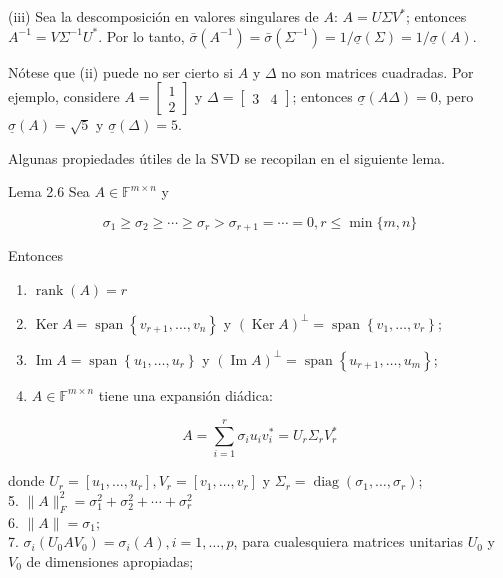 \documentclass[11pt]{article}
\begin{document}
(iii) Sea la descomposición en valores singulares de $A$: $A=U \Sigma V^{*}$; entonces $A^{-1}=V \Sigma^{-1} U^{*}$. Por lo tanto, $\bar{\sigma}\left(A^{-1}\right)=\bar{\sigma}\left(\Sigma^{-1}\right)=1 / \underline{\sigma}(\Sigma)=1 / \underline{\sigma}(A)$.

Nótese que (ii) puede no ser cierto si $A$ y $\Delta$ no son matrices cuadradas. Por ejemplo, considere $A=\left[\begin{array}{l}1 \\ 2\end{array}\right]$ y $\Delta=\left[\begin{array}{ll}3 & 4\end{array}\right]$; entonces $\underline{\sigma}(A \Delta)=0$, pero $\underline{\sigma}(A)=\sqrt{5}$ y $\underline{\sigma}(\Delta)=5$.

Algunas propiedades útiles de la SVD se recopilan en el siguiente lema.

Lema 2.6 Sea $A \in \mathbb{F}^{m \times n}$ y

$$
\sigma_{1} \geq \sigma_{2} \geq \cdots \geq \sigma_{r}>\sigma_{r+1}=\cdots=0, r \leq \min \{m, n\}
$$

Entonces

\begin{enumerate}
  \item $\operatorname{rank}(A)=r$
  \item $\operatorname{Ker} A=\operatorname{span}\left\{v_{r+1}, \ldots, v_{n}\right\}$ y $(\operatorname{Ker} A)^{\perp}=\operatorname{span}\left\{v_{1}, \ldots, v_{r}\right\}$;
  \item $\operatorname{Im} A=\operatorname{span}\left\{u_{1}, \ldots, u_{r}\right\}$ y $(\operatorname{Im} A)^{\perp}=\operatorname{span}\left\{u_{r+1}, \ldots, u_{m}\right\}$;
  \item $A \in \mathbb{F}^{m \times n}$ tiene una expansión diádica:
\end{enumerate}

$$
A=\sum_{i=1}^{r} \sigma_{i} u_{i} v_{i}^{*}=U_{r} \Sigma_{r} V_{r}^{*}
$$

donde $U_{r}=\left[u_{1}, \ldots, u_{r}\right], V_{r}=\left[v_{1}, \ldots, v_{r}\right]$ y $\Sigma_{r}=\operatorname{diag}\left(\sigma_{1}, \ldots, \sigma_{r}\right)$;\\
5. $\|A\|_{F}^{2}=\sigma_{1}^{2}+\sigma_{2}^{2}+\cdots+\sigma_{r}^{2}$\\
6. $\|A\|=\sigma_{1}$;\\
7. $\sigma_{i}\left(U_{0} A V_{0}\right)=\sigma_{i}(A), i=1, \ldots, p$, para cualesquiera matrices unitarias $U_{0}$ y $V_{0}$ de dimensiones apropiadas;
\end{document}
